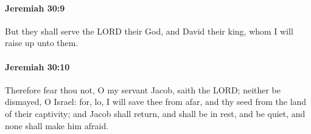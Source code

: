 		\paragraph{Jeremiah 30:9} %
			\label{JEREMIAH-30-9}

			But they shall serve the LORD their God, and David their king, whom I will raise up unto them.


		\paragraph{Jeremiah 30:10} %
			\label{JEREMIAH-30-10}

			Therefore fear thou not, O my servant Jacob, saith the LORD; neither be dismayed, O Israel: for, lo, I will save thee from afar, and thy seed from the land of their captivity; and Jacob shall return, and shall be in rest, and be quiet, and none shall make him afraid.


